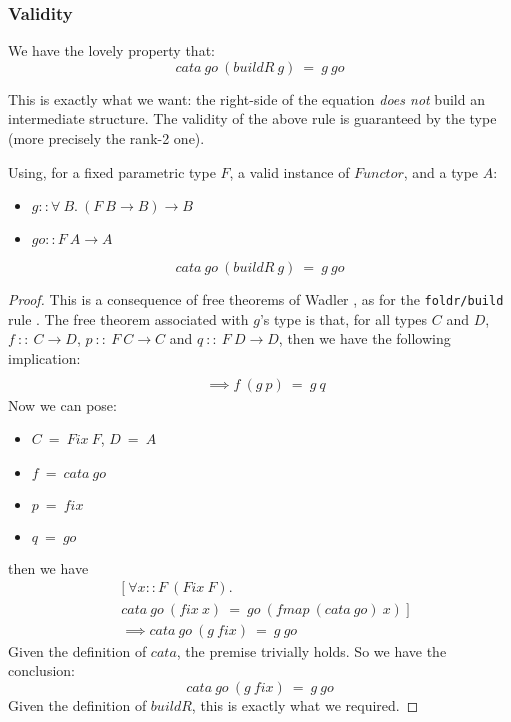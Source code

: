\subsubsection{Validity}
We have the lovely property that:
$$cata\ go\ (buildR\ g)\ =\ g\ go$$

This is exactly what we want: the right-side of the equation \emph{does not} build an intermediate structure. The validity of the above rule is guaranteed by the type (more precisely the rank-2 one).

\begin{theorem}
Using, for a fixed parametric type $F$, a valid instance of $Functor$, and a type $A$:
\begin{itemize}
	\item $g :: \forall\ B.\ (F\ B \to B) \to B$
	\item $go :: F\ A \to A $
\end{itemize}
$$cata\ go\ (buildR\ g)\ =\ g\ go$$
\end{theorem}
\begin{proof}
This is a consequence of free theorems of Wadler \cite{Wadler:1989:TF:99370.99404}, as for the \verb|foldr/build| rule \cite{Gill:1993:SCD:165180.165214}. The free theorem associated with $g$'s type is that, for all types $C$ and $D$, $f\ ::\ C \to D$, $p\ ::\ F\ C \to C$ and $q\ ::\ F\ D \to D$, then we have the following implication:
\begin{align*}
[\ \forall& x::C.\ f\ (p\ x)\ =\ q\ (fmap\ f\ x)\ ]\\
&\implies f\ (g\ p)\ =\ g\ q
\end{align*}
Now we can pose:
\begin{itemize}
	\item $C\ =\ Fix\ F$, $D\ =\ A$
	\item $f\ =\ cata\ go$
	\item $p\ =\ fix$
	\item $q\ =\ go$
\end{itemize}
then we have
\begin{align*}
&[\ \forall x::F\ (Fix\ F).\\
&cata\ go\ (fix\ x)\ =\ go\ (fmap\ (cata\ go)\ x)\ ]\\
&\implies cata\ go\ (g\ fix)\ =\ g\ go
\end{align*}
Given the definition of $cata$, the premise trivially holds. So we have the conclusion:
$$cata\ go\ (g\ fix)\ =\ g\ go$$
Given the definition of $buildR$, this is exactly what we required.
\end{proof}

